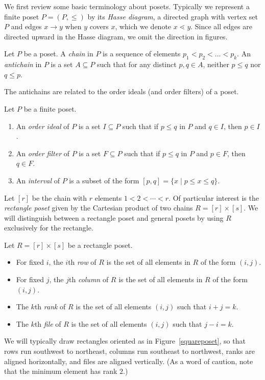 We first review some basic terminology about posets. Typically we represent a finite poset $P=(P, \leq)$ by its \emph{Hasse diagram}, a directed graph with vertex set $P$ and edges $x \to y$ when $y$ covers $x$, which we denote $x \lessdot y$. Since all edges are directed upward in the Hasse diagram, we omit the direction in figures.

\begin{Def}
Let $P$ be a poset. A \emph{chain} in $P$ is a sequence of elements $p_1 < p_2 < \dots < p_k$. An \emph{antichain} in $P$ is a set $A \subseteq P$ such that for any distinct $p,q \in A$, neither $p \leq q$ nor $q \leq p$.
\end{Def}

The antichains are related to the order ideals (and order filters) of a poset. 


\begin{Def} Let $P$ be a finite poset.
\begin{enumerate}
    \item An \emph{order ideal} of $P$ is a set $I \subseteq P$ such that if $p \leq q$ in $P$ and $q \in I$, then $p \in I$. %
    \item An \emph{order filter} of $P$ is a set $F \subseteq P$ such that if $p \leq q$ in $P$ and $p \in F$, then $q \in F$. %
    \item An \emph{interval} of $P$ is a subset of the form $[p,q]=\{ x \mid p \leq x \leq q \}$.
\end{enumerate}
\end{Def}

Let $[r]$ be the chain with $r$ elements $1 < 2 < \cdots < r$. Of particular interest is the \emph{rectangle poset} given by the Cartesian product of two chains $R = [r] \times [s]$. We will distinguish between a rectangle poset and general posets by using $R$ exclusively for the rectangle. 

\begin{Def}
Let $R = [r] \times [s]$ be a rectangle poset.
\begin{itemize}
    \item For fixed $i$, the $i$th \emph{row} of $R$ is the set of all elements in $R$ of the form $(i,j)$. 
    \item For fixed $j$, the $j$th \emph{column} of $R$ is the set of all elements in $R$ of the form $(i,j)$. 
    \item The $k$th \emph{rank} of $R$ is the set of all elements $(i,j)$ such that $i+j=k$.
    \item The $k$th \emph{file} of $R$ is the set of all elements $(i,j)$ such that $j-i=k$.
\end{itemize}
\end{Def}
We will typically draw rectangles oriented as in Figure~\ref{squareposet}, so that rows run southwest to northeast, columns run southeast to northwest, ranks are aligned horizontally, and files are aligned vertically. (As a word of caution, note that the minimum element has rank $2$.)

